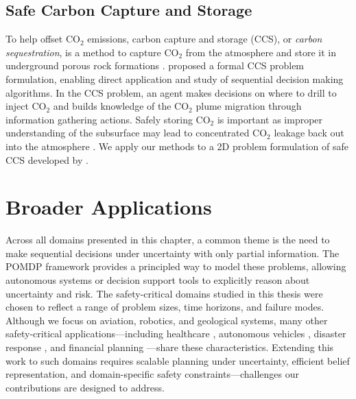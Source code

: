 \subsection{Safe Carbon Capture and Storage}
To help offset CO$_2$ emissions, carbon capture and storage (CCS), or \textit{carbon sequestration}, is a method to capture CO$_2$ from the atmosphere and store it in underground porous rock formations \cite{boothandford2014carbon}.
\textcite{wang2023optimizing} proposed a formal CCS problem formulation, enabling direct application and study of sequential decision making algorithms.
In the CCS problem, an agent makes decisions on where to drill to inject CO$_2$ and builds knowledge of the CO$_2$ plume migration through information gathering actions.
Safely storing CO$_2$ is important as improper understanding of the subsurface may lead to concentrated CO$_2$ leakage back out into the atmosphere \cite{lee2018co2}.
We apply our methods to a 2D problem formulation of safe CCS developed by \textcite{corso2022pomdp}.


\section{Broader Applications}

Across all domains presented in this chapter, a common theme is the need to make sequential decisions under uncertainty with only partial information.
The POMDP framework provides a principled way to model these problems, allowing autonomous systems or decision support tools to explicitly reason about uncertainty and risk.
The safety-critical domains studied in this thesis were chosen to reflect a range of problem sizes, time horizons, and failure modes.
Although we focus on aviation, robotics, and geological systems, many other safety-critical applications---including healthcare \cite{zhang2022diagnostic}, autonomous vehicles \cite{wray2021pomdps}, disaster response \cite{sankar2020evacuate}, and financial planning \cite{cho2017robust}---share these characteristics.
Extending this work to such domains requires scalable planning under uncertainty, efficient belief representation, and domain-specific safety constraints---challenges our contributions are designed to address.
